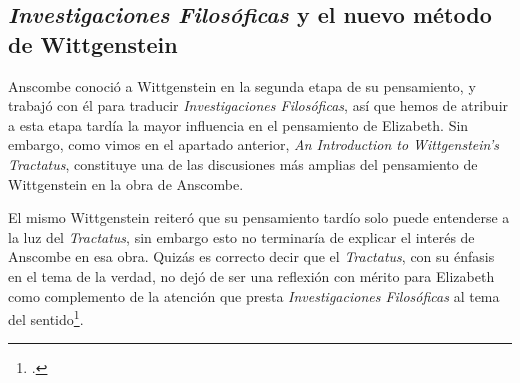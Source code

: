 
\subsection{\emph{Investigaciones Filosóficas} y el nuevo método de Wittgenstein}

Anscombe conoció a Wittgenstein en la segunda etapa de su pensamiento, y trabajó con él para traducir \emph{Investigaciones Filosóficas}, así que hemos de atribuir a esta etapa tardía la mayor influencia en el pensamiento de Elizabeth. Sin embargo, como vimos en el apartado anterior, \emph{An Introduction to Wittgenstein's Tractatus}, constituye una de las discusiones más amplias del pensamiento de Wittgenstein en la obra de Anscombe.

El mismo Wittgenstein reiteró que su pensamiento tardío solo puede entenderse a la luz del \emph{Tractatus}, sin embargo esto no terminaría de explicar el interés de Anscombe en esa obra. Quizás es correcto decir que el \emph{Tractatus}, con su énfasis en el tema de la verdad, no dejó de ser una reflexión con mérito para Elizabeth como complemento de la atención que presta \emph{Investigaciones Filosóficas} al tema del sentido\footcite[Cf.][191-193]{teichmann2008ans}.

